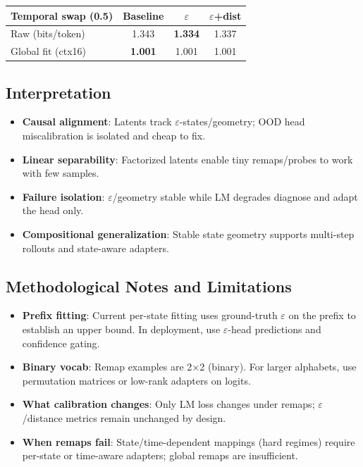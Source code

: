 \documentclass[11pt]{article}
\begin{document}
\vspace{-0.75em}
\begin{center}
\begin{tabular}{lccc}
\toprule
Temporal swap (0.5) & Baseline & $\varepsilon$ & $\varepsilon$+dist \\
\midrule
Raw (bits/token) & 1.343 & \textbf{1.334} & 1.337 \\
Global fit (ctx16) & \textbf{1.001} & 1.001 & 1.001 \\
\bottomrule
\end{tabular}
\end{center}

\subsection{Interpretation}
\begin{notebox}
\begin{itemize}
  \item \textbf{Causal alignment}: Latents track $\varepsilon$-states/geometry; OOD head miscalibration is isolated and cheap to fix.
  \item \textbf{Linear separability}: Factorized latents enable tiny remaps/probes to work with few samples.
  \item \textbf{Failure isolation}: $\varepsilon$/geometry stable while LM degrades \textrightarrow{} diagnose and adapt the head only.
  \item \textbf{Compositional generalization}: Stable state geometry supports multi-step rollouts and state-aware adapters.
\end{itemize}
\end{notebox}

\subsection{Methodological Notes and Limitations}
\begin{itemize}
  \item \textbf{Prefix fitting}: Current per-state fitting uses ground-truth $\varepsilon$ on the prefix to establish an upper bound. In deployment, use $\varepsilon$-head predictions and confidence gating.
  \item \textbf{Binary vocab}: Remap examples are 2×2 (binary). For larger alphabets, use permutation matrices or low-rank adapters on logits.
  \item \textbf{What calibration changes}: Only LM loss changes under remaps; $\varepsilon$/distance metrics remain unchanged by design.
  \item \textbf{When remaps fail}: State/time-dependent mappings (hard regimes) require per-state or time-aware adapters; global remaps are insufficient.
\end{itemize}
\end{document}
